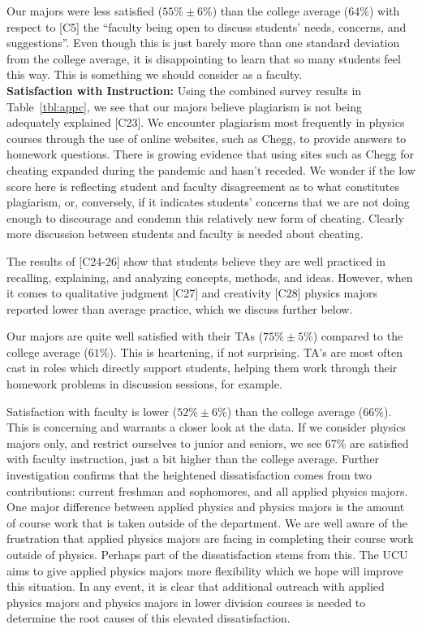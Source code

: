 \documentclass[12pt]{article}
\begin{document}
Our majors were less satisfied ($55\%\pm6\%$) than the college average
($64\%$) with respect to [C5] the ``faculty being open to discuss
students' needs, concerns, and suggestions''.  Even though this is
just barely more than one standard deviation from the college average,
it is disappointing to learn that so many students feel this way.
This is something we should consider as a faculty.\\[3pt]

\noindent
{\bf Satisfaction with Instruction:} Using the combined survey results
in Table~\ref{tbl:appc}, we see that our majors believe plagiarism is
not being adequately explained [C23].  We encounter plagiarism most
frequently in physics courses through the use of online websites, such
as Chegg, to provide answers to homework questions.  There is growing
evidence that using sites such as Chegg for cheating expanded during
the pandemic and hasn't receded.  We wonder if the low score here is
reflecting student and faculty disagreement as to what constitutes
plagiarism, or, conversely, if it indicates students' concerns that we
are not doing enough to discourage and condemn this relatively new
form of cheating.  Clearly more discussion between students and
faculty is needed about cheating.

The results of [C24-26] show that students believe they are well
practiced in recalling, explaining, and analyzing concepts, methods,
and ideas.  However, when it comes to qualitative judgment [C27] and
creativity [C28] physics majors reported lower than average practice,
which we discuss further below.

Our majors are quite well satisfied with their TAs ($75\% \pm 5\%$)
compared to the college average ($61\%$).  This is heartening, if not
surprising.  TA's are most often cast in roles which directly support
students, helping them work through their homework problems in
discussion sessions, for example.

Satisfaction with faculty is lower ($52\% \pm 6\%$) than the college
average ($66\%$).  This is concerning and warrants a closer look at
the data.  If we consider physics majors only, and restrict ourselves
to junior and seniors, we see 67\% are satisfied with faculty
instruction, just a bit higher than the college average.  Further
investigation confirms that the heightened dissatisfaction comes from
two contributions: current freshman and sophomores, and all applied
physics majors.  One major difference between applied physics and
physics majors is the amount of course work that is taken outside of
the department. We are well aware of the frustration that applied
physics majors are facing in completing their course work outside of
physics.  Perhaps part of the dissatisfaction stems from this.  The
UCU aims to give applied physics majors more flexibility which we hope
will improve this situation.  In any event, it is clear that
additional outreach with applied physics majors and physics majors in
lower division courses is needed to determine the root causes of this
elevated dissatisfaction.\\[3pt]
\end{document}
